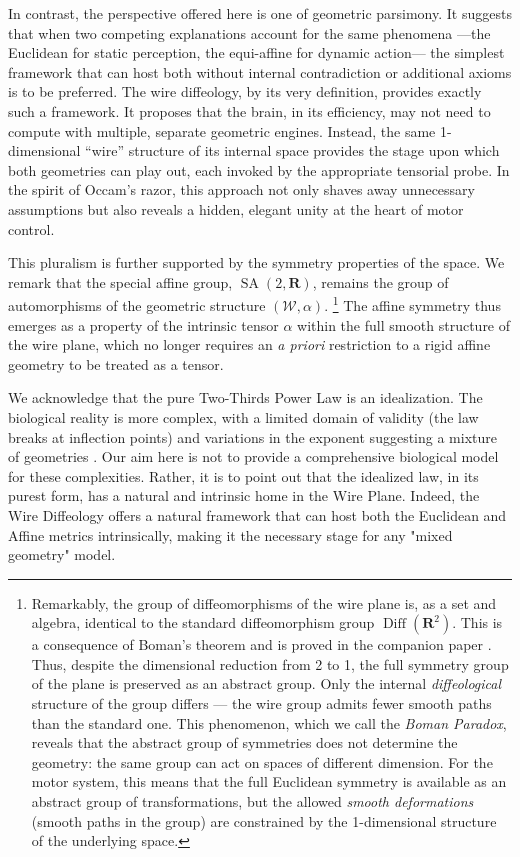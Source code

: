 \documentclass[10pt,letterpaper,reqno]{amsart}
\newcommand{\RR}{\mathbf{R}}
\newcommand{\cW}{\mathcal{W}}
\DeclareMathOperator{\SA}{SA}
\DeclareMathOperator{\Diff}{Diff}
\begin{document}
  In contrast,
  the perspective offered here is one of geometric parsimony.
  It suggests that when two competing explanations account for the same phenomena
  ---the Euclidean for static perception,
  the equi-affine for dynamic action---
  the simplest framework that can host both without internal contradiction
  or additional axioms is to be preferred.
  The wire diffeology,
  by its very definition,
  provides exactly such a framework.
  It proposes that the brain,
  in its efficiency,
  may not need to compute with multiple,
  separate geometric engines.
  Instead,
  the same 1-dimensional ``wire'' structure of its internal space
  provides the stage upon which both geometries can play out,
  each invoked by the appropriate tensorial probe.
  In the spirit of Occam's razor,
  this approach not only shaves away unnecessary assumptions
  but also reveals a hidden,
  elegant unity at the heart of motor control.
  
  This pluralism is further supported by the symmetry properties of the space.
  We remark that the special affine group, $\SA(2,\RR)$, remains the group of automorphisms of the geometric structure $(\cW,\alpha)$.%
  \footnote{Remarkably,
  the group of diffeomorphisms of the wire plane is,
  as a set and algebra,
  identical to the standard diffeomorphism group $\Diff(\RR^2)$.
  This is a consequence of Boman's theorem \cite{Bom67} and is proved in the companion paper \cite{PIZ25}.
  Thus, despite the dimensional reduction from 2 to 1,
  the full symmetry group of the plane is preserved as an abstract group.
  Only the internal \emph{diffeological} structure of the group differs ---
  the wire group admits fewer smooth paths than the standard one.
  This phenomenon, which we call the \emph{Boman Paradox},
  reveals that the abstract group of symmetries does not determine the geometry:
  the same group can act on spaces of different dimension.
  For the motor system, this means that the full Euclidean symmetry is available
  as an abstract group of transformations,
  but the allowed \emph{smooth deformations} (smooth paths in the group)
  are constrained by the 1-dimensional structure of the underlying space.}
  The affine symmetry thus emerges as a property of the intrinsic tensor $\alpha$ within the full smooth structure of the wire plane,
  which no longer requires an \emph{a priori} restriction to a rigid affine geometry to be treated as a tensor.
  
  We acknowledge that the pure Two-Thirds Power Law is an idealization.
  The biological reality is more complex,
  with a limited domain of validity (the law breaks at inflection points) and variations in the exponent suggesting a mixture of geometries \cite{BFBF09}.
  Our aim here is not to provide a comprehensive biological model for these complexities.
  Rather,
  it is to point out that the idealized law,
  in its purest form,
  has a natural and intrinsic home in the Wire Plane.
  Indeed,
  the Wire Diffeology offers a natural framework that can host both the Euclidean and Affine metrics intrinsically,
  making it the necessary stage for any "mixed geometry" model.
  
\end{document}
